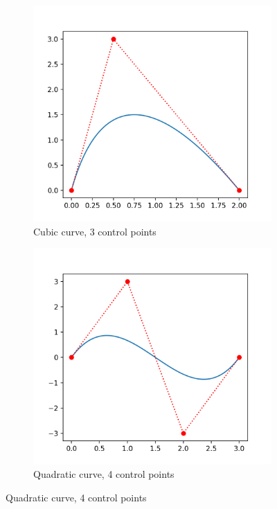\documentclass[12pt, letterpaper]{article}
\begin{document}
\begin{figure}[ht]
  \label{fig:BezierCurves1}
  \caption{Cubic and Quadratic Curves, Listing~\ref{lst:bez}}
  \begin{center}
    \begin{subfigure}[b]{.45\linewidth}
      \includegraphics[width=\linewidth]{Bez/cubicBez1}
      \caption{Cubic curve, 3 control points}
    \end{subfigure}
    \begin{subfigure}[b]{.45\linewidth}
      \includegraphics[width=\linewidth]{Bez/quadraticBez1} \caption{Quadratic curve, 4 control points}
    \end{subfigure}
  \end{center}
\end{figure}
\end{document}
